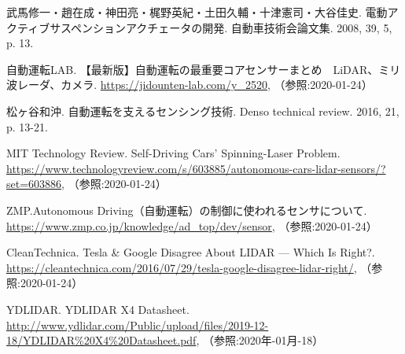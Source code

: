 {\small
\begin{thebibliography}{9}
   武馬修一・趙在成・神田亮・梶野英紀・土田久輔・十津憲司・大谷佳史. 電動アクティブサスペンションアクチェータの開発. 自動車技術会論文集. 2008, 39, 5, p. 13.

   自動運転LAB. 【最新版】自動運転の最重要コアセンサーまとめ　LiDAR、ミリ波レーダ、カメラ. \url{https://jidounten-lab.com/y_2520}, （参照:2020-01-24）

   松ヶ谷和沖. 自動運転を支えるセンシング技術. Denso technical review. 2016, 21, p. 13-21.

   MIT Technology Review. Self-Driving Cars’ Spinning-Laser Problem. \url{https://www.technologyreview.com/s/603885/autonomous-cars-lidar-sensors/?set=603886}, （参照:2020-01-24）

   ZMP.Autonomous Driving（自動運転）の制御に使われるセンサについて. \url{https://www.zmp.co.jp/knowledge/ad_top/dev/sensor}, （参照:2020-01-24）

   CleanTechnica. Tesla \& Google Disagree About LIDAR — Which Is Right?. \url{https://cleantechnica.com/2016/07/29/tesla-google-disagree-lidar-right/}, （参照:2020-01-24）


   YDLIDAR. YDLIDAR X4 Datasheet. \url{http://www.ydlidar.com/Public/upload/files/2019-12-18/YDLIDAR%20X4%20Datasheet.pdf}, （参照:2020年-01月-18）

\end{thebibliography}
}